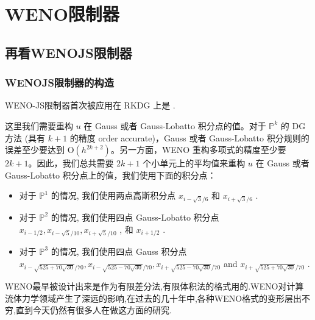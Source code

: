 \documentclass{book}
\begin{document}
\section{WENO限制器}

\subsection{再看WENOJS限制器}
\begin{figure}
    \centering
\end{figure}
\subsubsection{WENOJS限制器的构造}
WENO-JS限制器首次被应用在 RKDG 上是 \cite{RKDG+WENOJS-1,RKDG+WENOJS-2}.



这里我们需要重构 $u$ 在 Gauss 或者 Gauss-Lobatto 积分点的值。对于 $\mathbb{P}^{k}$ 的 DG 方法 (具有 $k+1$ 的精度 order accurate)，Gauss 或者 Gauss-Lobatto 积分规则的误差至少要达到 $\mathrm{O}\left(h^{2 k+2}\right)$。另一方面，WENO 重构多项式的精度至少要 $2 k+1$。因此，我们总共需要 $2k+1$ 个小单元上的平均值来重构 $u$ 在 Gauss 或者 Gauss-Lobatto 积分点上的值，我们使用下面的积分点：

\begin{itemize}
    \item 对于  $\mathbb{P}^{1}$  的情况, 我们使用两点高斯积分点  $x_{i-\sqrt{3} / 6}$  和  $x_{i+\sqrt{3} / 6}$ .
    \item 对于  $\mathbb{P}^{2}$  的情况, 我们使用四点 Gauss-Lobatto 积分点  $x_{i-1 / 2}, x_{i-\sqrt{5} / 10}, x_{i+\sqrt{5} / 10}$ , 和  $x_{i+1 / 2}$ .
    \item 对于  $\mathbb{P}^{3}$  的情况, 我们使用四点 Gauss 积分点  $x_{i-\sqrt{525+70 \sqrt{30}} / 70}, x_{i-\sqrt{525-70 \sqrt{30}} / 70}, x_{i+\sqrt{525-70 \sqrt{30}} / 70}$  and  $x_{i+\sqrt{525+70 \sqrt{30}} / 70}$ .
\end{itemize}

WENO最早被设计出来是作为有限差分法,有限体积法的格式用的.WENO对计算流体力学领域产生了深远的影响,在过去的几十年中,各种WENO格式的变形层出不穷,直到今天仍然有很多人在做这方面的研究.
\end{document}
